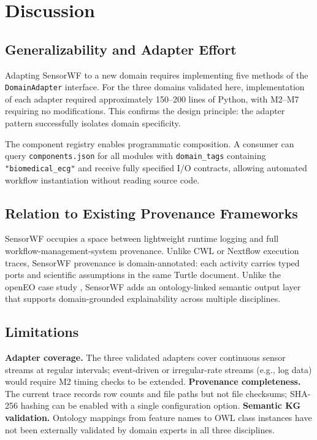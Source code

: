 \documentclass[conference]{IEEEtran}
\begin{document}
\section{Discussion}
\label{sec:discussion}

\subsection{Generalizability and Adapter Effort}

Adapting SensorWF to a new domain requires implementing five methods of the
\texttt{DomainAdapter} interface. For the three domains validated here,
implementation of each adapter required approximately 150--200 lines of Python,
with M2--M7 requiring no modifications. This confirms the design principle: the
adapter pattern successfully isolates domain specificity.

The component registry enables programmatic composition. A consumer can query
\texttt{components.json} for all modules with \texttt{domain\_tags} containing
\texttt{"biomedical\_ecg"} and receive fully specified I/O contracts, allowing
automated workflow instantiation without reading source code.

\subsection{Relation to Existing Provenance Frameworks}

SensorWF occupies a space between lightweight runtime logging and full
workflow-management-system provenance. Unlike CWL or Nextflow execution traces,
SensorWF provenance is domain-annotated: each activity carries typed ports and
scientific assumptions in the same Turtle document. Unlike the openEO case study
\cite{rossi2025openeo}, SensorWF adds an ontology-linked semantic output layer
that supports domain-grounded explainability across multiple disciplines.

\subsection{Limitations}

\textbf{Adapter coverage.} The three validated adapters cover continuous
sensor streams at regular intervals; event-driven or irregular-rate streams
(e.g., log data) would require M2 timing checks to be extended.
\textbf{Provenance completeness.} The current trace records row counts and file
paths but not file checksums; SHA-256 hashing can be enabled with a single
configuration option.
\textbf{Semantic KG validation.} Ontology mappings from feature names to OWL class
instances have not been externally validated by domain experts in all three
disciplines.
\end{document}

